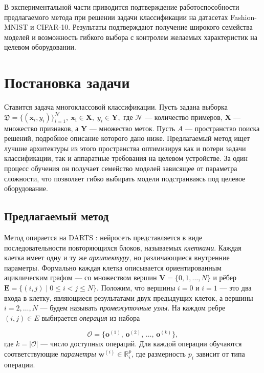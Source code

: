 \documentclass{article}
\begin{document}
В экспериментальной части приводится подтверждение работоспособности предлагаемого метода при решении задачи классификации на датасетах Fashion-MNIST и CIFAR-10. Результаты подтверждают получение широкого семейства моделей и возможность гибкого выбора с контролем желаемых характеристик на целевом оборудовании.


\section{Постановка задачи}

Ставится задача многоклассовой классификации. Пусть задана выборка $
    \mathfrak D = \{(\boldsymbol{x}_i, y_i)\}_{i=1}^{\mathcal N},
    \ \boldsymbol{x_i} \in \mathbf X,\; y_i \in \mathbf Y, $
где $\mathcal N$ — количество примеров, $\mathbf X$ — множество признаков, а $\mathbf Y$ --- множество меток. Пусть $\textit{A}$ --- пространство поиска решений, подробное описание которого дано ниже.
Предлагаемый метод ищет лучшие архитектуры из этого пространства оптимизируя как и потери задачи классификации, так и аппаратные требования на целевом устройстве. За один процесс обучения он получает семейство моделей зависящее от параметра сложности, что позволяет гибко выбирать модели подстраиваясь под целевое оборудование.   

\subsection{Предлагаемый метод}

Метод опирается на DARTS%
: нейросеть представляется в виде последовательности повторяющихся блоков, называемых \textit{клетками}. Каждая клетка имеет одну и ту же \textit{архитектуру}, но различающиеся внутренние параметры. Формально каждая клетка описывается ориентированным ациклическим графом --- со множеством вершин $ \textbf{V} = \{0,1,\dots,N\}$ и рёбер $ \textbf{E} = \bigl\{(i,j)\mid 0 \le i < j \le N\bigr\}.$ Положим, что вершины $i=0$ и $i=1$ --- это два входа в клетку, являющиеся результатами двух предыдущих клеток, а вершины $i=2,\dots,N$ --- будем называть \textit{промежуточные узлы}. На каждом ребре $(i,j)\in E$ выбирается \textit{операция} из набора

$$
    \mathcal O = \bigl\{\mathbf{o}^{(1)},\,\mathbf{o}^{(2)},\,\dots,\,\mathbf{o}^{(k)}\bigr\},
$$
где $k = |\mathcal O|$ — число доступных операций. Для каждой операции обучаются соответствующие \textit{параметры} $\boldsymbol{w}^{(i)} \in \mathbb R^p_i$, где размерность $p_i$ зависит от типа операции. %
\end{document}

